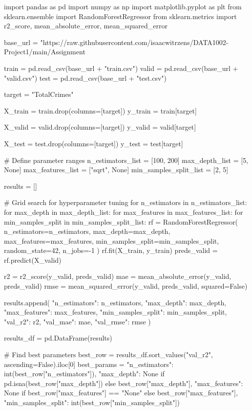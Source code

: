 import pandas as pd
import numpy as np
import matplotlib.pyplot as plt
from sklearn.ensemble import RandomForestRegressor
from sklearn.metrics import r2_score, mean_absolute_error, mean_squared_error

base_url = "https://raw.githubusercontent.com/isaacwitrzens/DATA1002-Project1/main/Assignment%

train = pd.read_csv(base_url + "train.csv")
valid = pd.read_csv(base_url + "valid.csv")
test = pd.read_csv(base_url + "test.csv")

target = "TotalCrimes"

X_train = train.drop(columns=[target])
y_train = train[target]

X_valid = valid.drop(columns=[target])
y_valid = valid[target]

X_test = test.drop(columns=[target])
y_test = test[target]

# Define parameter ranges
n_estimators_list = [100, 200]
max_depth_list = [5, None]
max_features_list = ["sqrt", None]
min_samples_split_list = [2, 5]

results = []

# Grid search for hyperparameter tuning
for n_estimators in n_estimators_list:
    for max_depth in max_depth_list:
        for max_features in max_features_list:
            for min_samples_split in min_samples_split_list:
                rf = RandomForestRegressor(
                    n_estimators=n_estimators,
                    max_depth=max_depth,
                    max_features=max_features,
                    min_samples_split=min_samples_split,
                    random_state=42,
                    n_jobs=-1
                )
                rf.fit(X_train, y_train)
                preds_valid = rf.predict(X_valid)

                r2 = r2_score(y_valid, preds_valid)
                mae = mean_absolute_error(y_valid, preds_valid)
                rmse = mean_squared_error(y_valid, preds_valid, squared=False)

                results.append({
                    "n_estimators": n_estimators,
                    "max_depth": max_depth,
                    "max_features": max_features,
                    "min_samples_split": min_samples_split,
                    "val_r2": r2,
                    "val_mae": mae,
                    "val_rmse": rmse
                })

results_df = pd.DataFrame(results)

# Find best parameters
best_row = results_df.sort_values("val_r2", ascending=False).iloc[0]
best_params = {
    "n_estimators": int(best_row["n_estimators"]),
    "max_depth": None if pd.isna(best_row["max_depth"]) else best_row["max_depth"],
    "max_features": None if best_row["max_features"] == "None" else best_row["max_features"],
    "min_samples_split": int(best_row["min_samples_split"])
}

